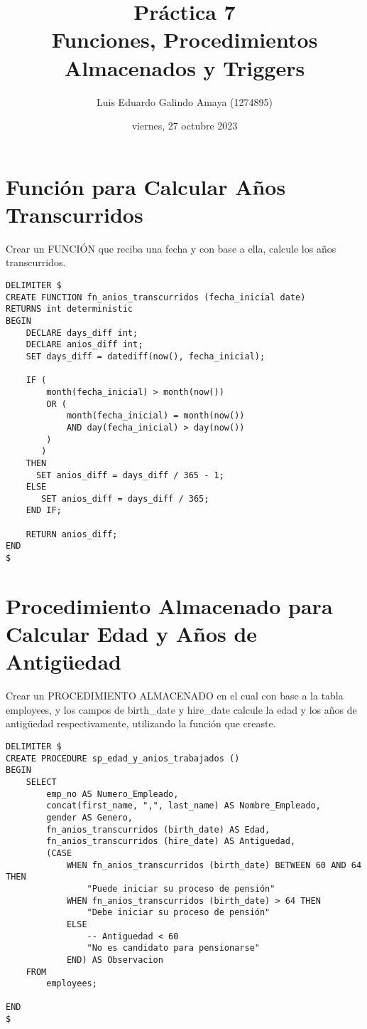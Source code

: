 \documentclass[11pt]{article}
\author{Luis Eduardo Galindo Amaya (1274895)}
\date{viernes, 27 octubre 2023}
\title{Práctica 7\\\medskip
\large Funciones, Procedimientos Almacenados y Triggers}
\begin{document}
\maketitle
\tableofcontents

\pagebreak

\section{Función para Calcular Años Transcurridos}
\label{sec:org0d84073}
Crear un FUNCIÓN que reciba una fecha y con base a ella, calcule los
años transcurridos.

\begin{verbatim}
DELIMITER $ 
CREATE FUNCTION fn_anios_transcurridos (fecha_inicial date)
RETURNS int deterministic
BEGIN
    DECLARE days_diff int;
    DECLARE anios_diff int;
    SET days_diff = datediff(now(), fecha_inicial);

    IF (
        month(fecha_inicial) > month(now())
        OR (
            month(fecha_inicial) = month(now()) 
            AND day(fecha_inicial) > day(now())
        )
       )
    THEN
      SET anios_diff = days_diff / 365 - 1;
    ELSE
       SET anios_diff = days_diff / 365;
    END IF;

    RETURN anios_diff;
END
$
\end{verbatim}

\section{Procedimiento Almacenado para Calcular Edad y Años de Antigüedad}
\label{sec:org1cde22f}
Crear un PROCEDIMIENTO ALMACENADO en el cual con base a la tabla employees, y 
los campos de birth\_date y hire\_date calcule la edad y los años de antigüedad 
respectivamente, utilizando la función que creaste.

\begin{verbatim}
DELIMITER $ 
CREATE PROCEDURE sp_edad_y_anios_trabajados ()
BEGIN
    SELECT
        emp_no AS Numero_Empleado,
        concat(first_name, ",", last_name) AS Nombre_Empleado,
        gender AS Genero,
        fn_anios_transcurridos (birth_date) AS Edad,
        fn_anios_transcurridos (hire_date) AS Antiguedad,
        (CASE
            WHEN fn_anios_transcurridos (birth_date) BETWEEN 60 AND 64 THEN
                "Puede iniciar su proceso de pensión"
            WHEN fn_anios_transcurridos (birth_date) > 64 THEN
                "Debe iniciar su proceso de pensión"
            ELSE
                -- Antiguedad < 60
                "No es candidato para pensionarse"
            END) AS Observacion
    FROM
        employees;

END 
$
\end{verbatim}
\end{document}
